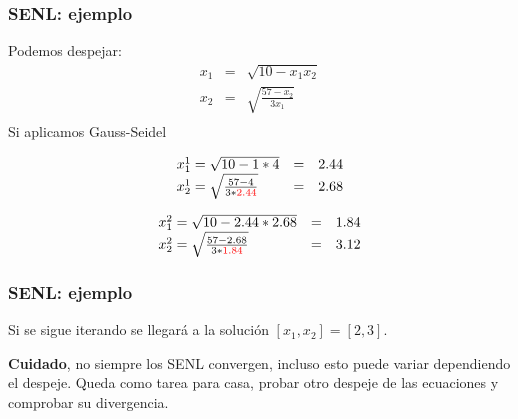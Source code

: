 \documentclass[xcolor=svgnames]{beamer} %
\theoremstyle{plain}
\renewcommand{\textbf}[1]{{\bfseries\textcolor{redUnq2}{#1}}}
\theoremstyle{definition}
\begin{document}
\begin{frame}
\frametitle{SENL: ejemplo}
Podemos despejar:
$$\begin{array}{ccc}
x_1 & = & \sqrt{10-x_1 x_2} \\
x_2 & = & \sqrt{\frac{57-x_2}{3x_1}} \\
\end{array} $$
\pause
Si aplicamos Gauss-Seidel

\begin{minipage}{.45\linewidth}
$$\begin{array}{lcc}
x_1^1 = \sqrt{10 -1*4} & = & 2.44 \\
x_2^1 = \sqrt{ \frac{57 - 4}{3* {\color{red} 2.44} }} & = & 2.68
\end{array}  $$
\end{minipage} \vrule \begin{minipage}{.45\linewidth}
$$\begin{array}{lcc}
x_1^2 = \sqrt{10 -2.44*2.68} & = & 1.84 \\
x_2^2 = \sqrt{ \frac{57 - 2.68}{3* {\color{red} 1.84} }} & = & 3.12
\end{array}  $$
\end{minipage}

\end{frame}


\begin{frame}
\frametitle{SENL: ejemplo}
Si se sigue iterando se llegará a la solución $[x_1,x_2] = [2,3]$.

\pause
\textbf{Cuidado}, no siempre los SENL convergen, incluso esto puede variar dependiendo el despeje. Queda como tarea para casa, probar otro despeje de las ecuaciones y comprobar su divergencia.
\end{frame}
\end{document}
